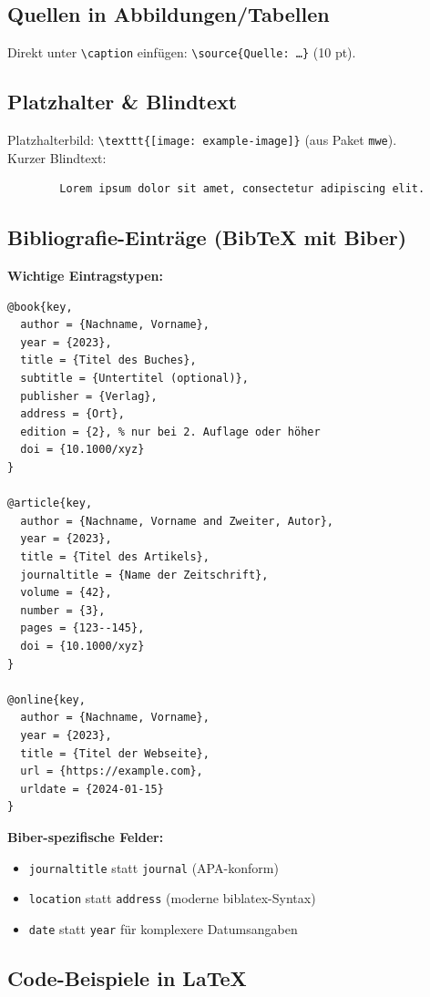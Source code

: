 \documentclass[11pt,a4paper]{article}
\makeatletter
\newcommand{\source}[1]{\caption*{\footnotesize #1}} %
\renewcommand\footnotesize{\@setfontsize\footnotesize{10pt}{12pt}}
\makeatother
\begin{document}
    \subsection*{Quellen in Abbildungen/Tabellen}
    Direkt unter \verb|\caption| einfügen: \verb|\source{Quelle: …}| (10 pt).

    \subsection*{Platzhalter \& Blindtext}
    Platzhalterbild: \verb|\texttt{[image: example-image]}| (aus Paket \verb|mwe|).\\
    Kurzer Blindtext:
    \begin{verbatim}
        Lorem ipsum dolor sit amet, consectetur adipiscing elit.
    \end{verbatim}

    \subsection*{Bibliografie-Einträge (BibTeX mit Biber)}
    \textbf{Wichtige Eintragstypen:}
    \begin{verbatim}
@book{key,
  author = {Nachname, Vorname},
  year = {2023},
  title = {Titel des Buches},
  subtitle = {Untertitel (optional)},
  publisher = {Verlag},
  address = {Ort},
  edition = {2}, % nur bei 2. Auflage oder höher
  doi = {10.1000/xyz}
}

@article{key,
  author = {Nachname, Vorname and Zweiter, Autor},
  year = {2023},
  title = {Titel des Artikels},
  journaltitle = {Name der Zeitschrift},
  volume = {42},
  number = {3},
  pages = {123--145},
  doi = {10.1000/xyz}
}

@online{key,
  author = {Nachname, Vorname},
  year = {2023},
  title = {Titel der Webseite},
  url = {https://example.com},
  urldate = {2024-01-15}
}
    \end{verbatim}

    \textbf{Biber-spezifische Felder:}
    \begin{itemize}
        \item \verb|journaltitle| statt \verb|journal| (APA-konform)
        \item \verb|location| statt \verb|address| (moderne biblatex-Syntax)
        \item \verb|date| statt \verb|year| für komplexere Datumsangaben
    \end{itemize}

\subsection*{Code-Beispiele in LaTeX}
\end{document}

